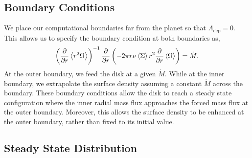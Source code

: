\subsection{Boundary Conditions} \label{sec:boundary_conditions}
We place our computational boundaries far from the planet so that $\Lambda_\text{dep} = 0$. This allows us to specify the boundary condition at both boundaries as,
\begin{equation} \label{eq:bc}
\left( \pderiv{r} \avg{r^2 \Omega} \right)^{-1} \pderiv{r} \left( -2 \pi r \nu \avg{\Sigma} r^2 \pderiv{r} \avg{\Omega} \right) = \dot{M} .
\end{equation}
At the outer boundary, we feed the disk at a given $\dot{M}$. While at the inner boundary, we extrapolate the surface density assuming a constant $\dot{M}$ across the boundary. These boundary conditions allow the disk to reach a steady state configuration where the inner radial mass flux approaches the forced mass flux at the outer boundary. Moreover, this allows the surface density to be enhanced at the outer boundary, rather than fixed to its initial value. 




\subsection{Steady State Distribution} \label{sec:steady_state_distribution}

